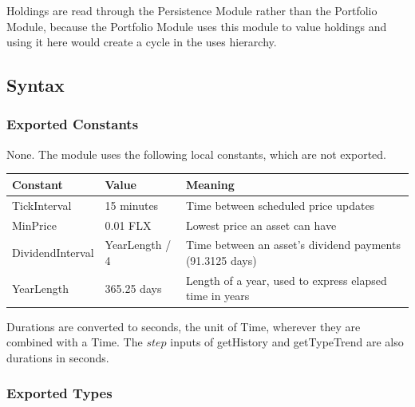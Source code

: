 \documentclass[12pt, titlepage]{article}
\begin{document}
\noindent Holdings are read through the Persistence Module rather than the
Portfolio Module, because the Portfolio Module uses this module to value
holdings and using it here would create a cycle in the uses hierarchy.

\subsection{Syntax}

\subsubsection{Exported Constants}

None. The module uses the following local constants, which are not exported.

\begin{center}
\renewcommand{\arraystretch}{1.2}
\begin{tabular}{l l >{\raggedright\arraybackslash}p{7cm}}
\toprule
\textbf{Constant} & \textbf{Value} & \textbf{Meaning}\\
\midrule
\textsf{TickInterval} & 15 minutes & Time between scheduled price updates\\
\textsf{MinPrice} & 0.01 FLX & Lowest price an asset can have\\
\textsf{DividendInterval} & \textsf{YearLength} / 4 & Time between an
  asset's dividend payments (91.3125 days)\\
\textsf{YearLength} & 365.25 days & Length of a year, used to express
  elapsed time in years\\
\bottomrule
\end{tabular}
\end{center}

\noindent Durations are converted to seconds, the unit of Time, wherever they
are combined with a Time. The $\mathit{step}$ inputs of getHistory and
getTypeTrend are also durations in seconds.

\subsubsection{Exported Types}
\end{document}
